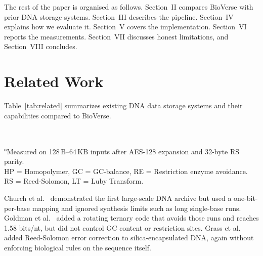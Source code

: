 \documentclass[conference]{IEEEtran}
\begin{document}
The rest of the paper is organised as follows. Section~II compares BioVerse with prior DNA storage systems. Section~III describes the pipeline. Section~IV explains how we evaluate it. Section~V covers the implementation. Section~VI reports the measurements. Section~VII discusses honest limitations, and Section~VIII concludes.

\section{Related Work}

Table~\ref{tab:related} summarizes existing DNA data storage systems and their capabilities compared to BioVerse.

\begin{table}[htbp]
\caption{Comparison of DNA Data Storage Systems}
\begin{center}
\setlength{\tabcolsep}{3pt}
\renewcommand{\arraystretch}{1.1}
\\[2pt]
{\footnotesize\raggedright
\textsuperscript{a}Measured on 128\,B--64\,KB inputs after AES-128 expansion and 32-byte RS parity.\\
HP = Homopolymer, GC = GC-balance, RE = Restriction enzyme avoidance.\\
RS = Reed-Solomon, LT = Luby Transform.\par}
\label{tab:related}
\end{center}
\end{table}

Church et al.\ \cite{b2} demonstrated the first large-scale DNA archive but used a one-bit-per-base mapping and ignored synthesis limits such as long single-base runs. Goldman et al.\ \cite{b3} added a rotating ternary code that avoids those runs and reaches 1.58 bits/nt, but did not control GC content or restriction sites. Grass et al.\ \cite{b6} added Reed-Solomon error correction to silica-encapsulated DNA, again without enforcing biological rules on the sequence itself.
\end{document}
